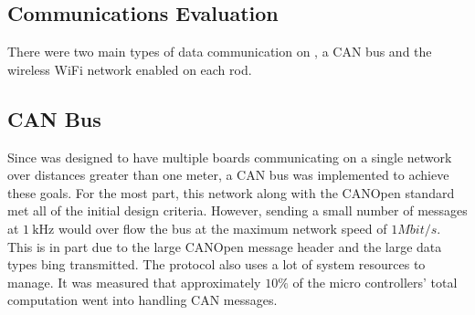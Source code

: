\begin{appendices}



\section{Communications Evaluation}
There were two main types of data communication on \SB{}, a CAN bus and the wireless WiFi network enabled on each rod.

\subsection{CAN Bus}
Since \SB{} was designed to have multiple boards communicating on a single network over distances greater than one meter, a CAN bus was implemented to achieve these goals.
For the most part, this network along with the CANOpen standard met all of the initial design criteria.
However, sending a small number of messages at \(\SI{1}{\kilo\hertz}\) would over flow the bus at the maximum network speed of \(1 Mbit/s\).
This is in part due to the large CANOpen message header and the large data types bing transmitted.
The protocol also uses a lot of system resources to manage.
It was measured that approximately \(10\%\) of the micro controllers' total computation went into handling CAN messages.


\end{appendices}

